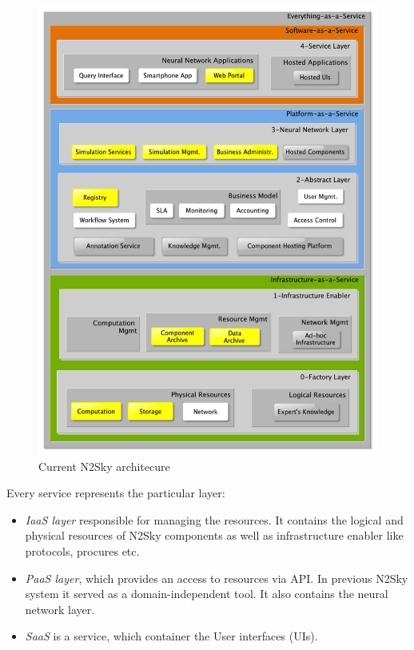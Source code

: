 \begin{figure}[htbp]
\begin{center}
  \includegraphics[width=\linewidth]{components/2/current_arch.png}
  \caption{Current N2Sky architecure}
  \label{fig:current_arch}
\end{center}
\end{figure}

Every service represents the particular layer:
\begin{itemize}
\item \emph{IaaS layer}  responsible for managing  the resources. It contains the logical and physical resources of N2Sky components as well as infrastructure enabler like protocols, procures etc. 
\item \emph{PaaS layer}, which provides an access to resources via API. In previous N2Sky system it served as a domain-independent tool. It also contains the neural network layer.
\item \emph{SaaS} is a service, which container the User interfaces (UIs).
\end{itemize}

